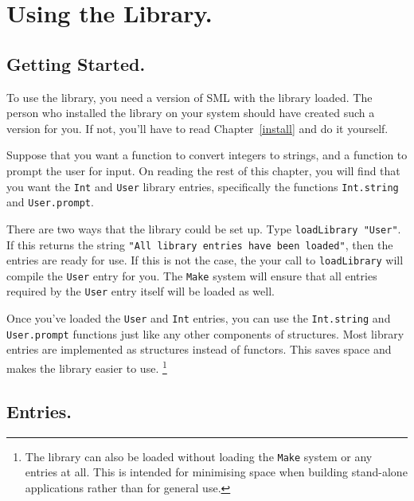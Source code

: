 %
%
%
%
%

\chapter{Using the Library.}	\label{user}

\section{Getting Started.}

To use the library, you need a version of SML with the library loaded.
The person who installed the library on your system should have created
such a version for you.  If not, you'll have to read Chapter~\ref{install}
and do it yourself.

Suppose that you want a function to convert integers to strings,
and a function to prompt the user for input.  On reading the rest of this
chapter, you will find that you want the {\tt Int} and {\tt User} library
entries, specifically the functions {\tt Int.string} and
{\tt User.prompt}.

There are two ways that the library could be set up.
Type {\tt loadLibrary "User"}.  If this returns the
string {\tt "All library entries have been loaded"},
then the entries are ready for use.  If this is not the case, the
your call to {\tt loadLibrary} will compile the {\tt User} entry for you.
The {\tt Make} system will ensure that all entries required by the
{\tt User} entry itself will be loaded as well.

Once you've loaded the {\tt User} and {\tt Int} entries, you can use
the {\tt Int.string} and {\tt User.prompt} functions just like any
other components of structures.  Most library entries are implemented
as structures instead of functors. This saves space and makes the
library easier to use.
\footnote{The library can also be loaded without loading the {\tt Make}
system or any entries at all.  This is intended for minimising space
when building stand-alone applications rather than for general use.}


\section{Entries.}

